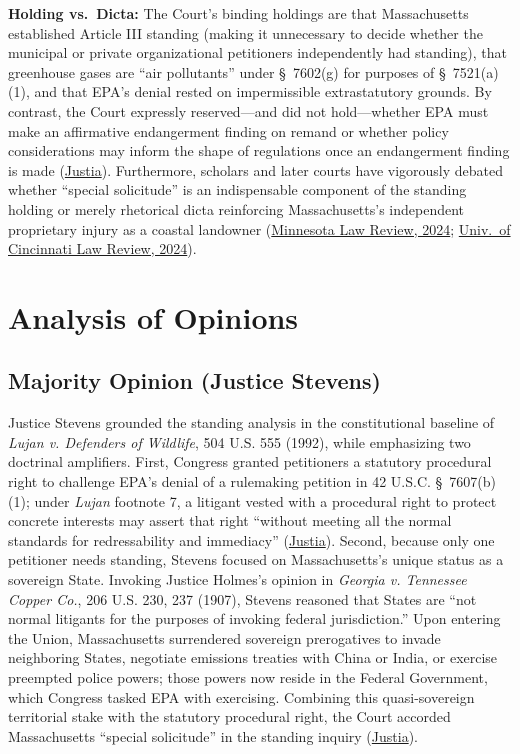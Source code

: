 \documentclass[12pt]{article}
\begin{document}
\textbf{Holding vs.\ Dicta:} The Court's binding holdings are that Massachusetts established Article III standing (making it unnecessary to decide whether the municipal or private organizational petitioners independently had standing), that greenhouse gases are ``air pollutants'' under \S\ 7602(g) for purposes of \S\ 7521(a)(1), and that EPA's denial rested on impermissible extrastatutory grounds. By contrast, the Court expressly reserved---and did not hold---whether EPA must make an affirmative endangerment finding on remand or whether policy considerations may inform the shape of regulations once an endangerment finding is made (\href{https://supreme.justia.com/cases/federal/us/549/497/}{Justia}). Furthermore, scholars and later courts have vigorously debated whether ``special solicitude'' is an indispensable component of the standing holding or merely rhetorical dicta reinforcing Massachusetts's independent proprietary injury as a coastal landowner (\href{https://scholarship.law.umn.edu/cgi/viewcontent.cgi?article=1011&context=minnlrev}{Minnesota Law Review, 2024}; \href{https://scholarship.law.uc.edu/cgi/viewcontent.cgi?article=1550&context=uclr}{Univ.\ of Cincinnati Law Review, 2024}).

\section{Analysis of Opinions}

\subsection{Majority Opinion (Justice Stevens)}

Justice Stevens grounded the standing analysis in the constitutional baseline of \textit{Lujan v. Defenders of Wildlife}, 504 U.S. 555 (1992), while emphasizing two doctrinal amplifiers. First, Congress granted petitioners a statutory procedural right to challenge EPA's denial of a rulemaking petition in 42 U.S.C. \S\ 7607(b)(1); under \textit{Lujan} footnote 7, a litigant vested with a procedural right to protect concrete interests may assert that right ``without meeting all the normal standards for redressability and immediacy'' (\href{https://supreme.justia.com/cases/federal/us/549/497/}{Justia}). Second, because only one petitioner needs standing, Stevens focused on Massachusetts's unique status as a sovereign State. Invoking Justice Holmes's opinion in \textit{Georgia v. Tennessee Copper Co.}, 206 U.S. 230, 237 (1907), Stevens reasoned that States are ``not normal litigants for the purposes of invoking federal jurisdiction.'' Upon entering the Union, Massachusetts surrendered sovereign prerogatives to invade neighboring States, negotiate emissions treaties with China or India, or exercise preempted police powers; those powers now reside in the Federal Government, which Congress tasked EPA with exercising. Combining this quasi-sovereign territorial stake with the statutory procedural right, the Court accorded Massachusetts ``special solicitude'' in the standing inquiry (\href{https://supreme.justia.com/cases/federal/us/549/497/}{Justia}).
\end{document}
